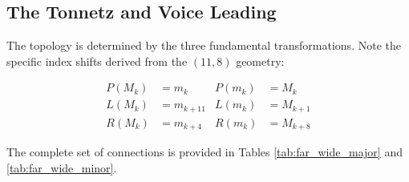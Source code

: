 \documentclass[12pt,letterpaper]{amsart}
\begin{document}
\subsection{The Tonnetz and Voice Leading}
The topology is determined by the three fundamental transformations. Note the specific index shifts derived from the $(11,8)$ geometry:

\begin{align*}
    P(M_k) &= m_k & P(m_k) &= M_k \\
    L(M_k) &= m_{k+11} & L(m_k) &= M_{k+1} \\
    R(M_k) &= m_{k+4} & R(m_k) &= M_{k+8}
\end{align*}

The complete set of connections is provided in Tables \ref{tab:far_wide_major} and \ref{tab:far_wide_minor}.
\end{document}
